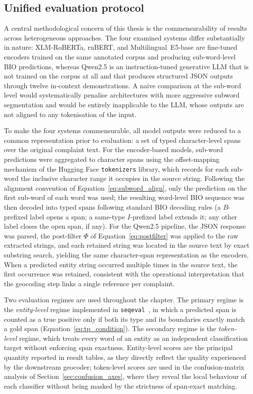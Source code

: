 \subsection{Unified evaluation protocol}
\label{sec:unified_protocol}

A central methodological concern of this thesis is the commensurability of results across heterogeneous approaches. The four examined systems differ substantially in nature: XLM-RoBERTa, ruBERT, and Multilingual~E5-base are fine-tuned encoders trained on the same annotated corpus and producing sub-word-level BIO predictions, whereas Qwen2.5 is an instruction-tuned generative LLM that is not trained on the corpus at all and that produces structured JSON outputs through twelve in-context demonstrations. A naive comparison at the sub-word level would systematically penalise architectures with more aggressive subword segmentation and would be entirely inapplicable to the LLM, whose outputs are not aligned to any tokenisation of the input.

To make the four systems commensurable, all model outputs were reduced to a common representation prior to evaluation: a set of typed character-level spans over the original complaint text. For the encoder-based models, sub-word predictions were aggregated to character spans using the offset-mapping mechanism of the Hugging Face \texttt{tokenizers} library, which records for each sub-word the inclusive character range it occupies in the source string. Following the alignment convention of Equation~\eqref{eq:subword_align}, only the prediction on the first sub-word of each word was used; the resulting word-level BIO sequence was then decoded into typed spans following standard BIO decoding rules (a $B$-prefixed label opens a span; a same-type $I$-prefixed label extends it; any other label closes the open span, if any). For the Qwen2.5 pipeline, the JSON response was parsed, the post-filter $\Phi$ of Equation~\eqref{eq:postfilter} was applied to the raw extracted strings, and each retained string was located in the source text by exact substring search, yielding the same character-span representation as the encoders. When a predicted entity string occurred multiple times in the source text, the first occurrence was retained, consistent with the operational interpretation that the geocoding step links a single reference per complaint.

Two evaluation regimes are used throughout the chapter. The primary regime is the \emph{entity-level} regime implemented in \texttt{seqeval}~\cite{seqeval2018}, in which a predicted span is counted as a true positive only if both its type and its boundaries exactly match a gold span (Equation~\eqref{eq:tp_condition}). The secondary regime is the \emph{token-level} regime, which treats every word of an entity as an independent classification target without enforcing span exactness. Entity-level scores are the principal quantity reported in result tables, as they directly reflect the quality experienced by the downstream geocoder; token-level scores are used in the confusion-matrix analysis of Section~\ref{sec:confusion_axes}, where they reveal the local behaviour of each classifier without being masked by the strictness of span-exact matching.

